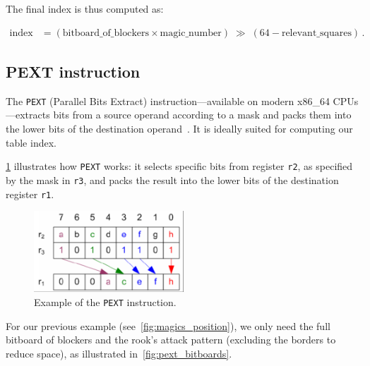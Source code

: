 \noindent The final index is thus computed as:

\begin{align*}
    \text{index} 
    &= (\text{bitboard\_of\_blockers} \times \text{magic\_number})
       \;\gg\;(64 - \text{relevant\_squares})\,.
\end{align*}

\subsection*{PEXT instruction}

\noindent The \texttt{PEXT} (Parallel Bits Extract) instruction—available on modern x86\_64 CPUs—extracts bits from a source operand according to a mask and packs them into the lower bits of the destination operand~\cite{PextInstruction}. It is ideally suited for computing our table index.

\vspace{1em}

\noindent\cref{fig:pext_instruction_example} illustrates how \texttt{PEXT} works: it selects specific bits from register \texttt{r2}, as specified by the mask in \texttt{r3}, and packs the result into the lower bits of the destination register \texttt{r1}.

\vspace{1em}

\begin{figure}
    \centering
    \includegraphics[width=0.5\textwidth]{Imagenes/pext.png}
    \caption{Example of the \texttt{PEXT} instruction.}\label{fig:pext_instruction_example}
\end{figure}

\noindent For our previous example (see~\cref{fig:magics_position}), we only need the full bitboard of blockers and the rook’s attack pattern (excluding the borders to reduce space), as illustrated in~\cref{fig:pext_bitboards}.

\vspace{1em}

